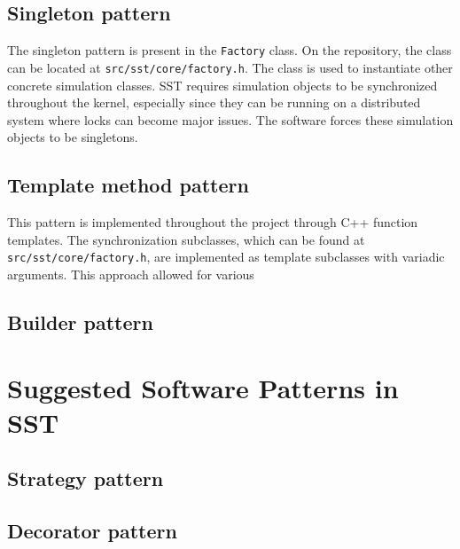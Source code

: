 \documentclass[titlepage]{article}
\begin{document}
\subsection{Singleton pattern}
The singleton pattern is present in the \texttt{Factory} class. On the repository, the class can be located at \texttt{src/sst/core/factory.h}. The class is used to instantiate other concrete simulation classes. SST requires simulation objects to be synchronized throughout the kernel, especially since they can be running on a distributed system where locks can become major issues. The software forces these simulation objects to be singletons.

\subsection{Template method pattern}
This pattern is implemented throughout the project through C++ function templates. The synchronization subclasses, which can be found at \texttt{src/sst/core/factory.h}, are implemented as template subclasses with variadic arguments. This approach allowed for various 

\subsection{Builder pattern}

\section{Suggested Software Patterns in SST}

\subsection{Strategy pattern}

\subsection{Decorator pattern}



\end{document}
